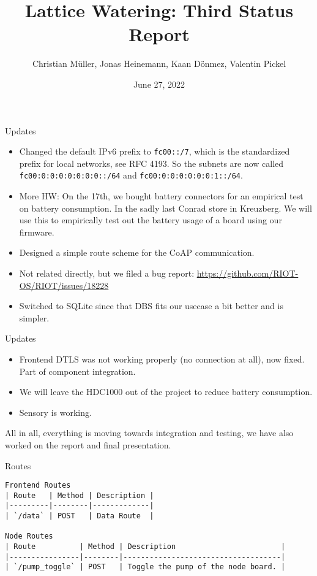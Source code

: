 \documentclass[10pt, xcolor=svgnames]{beamer}
\title{Lattice Watering: Third Status Report}
\author{Christian Müller, Jonas Heinemann, Kaan Dönmez, Valentin Pickel}
\institute{
    Software Project on Internet Communication

    Summer Term 2022
    
    Freie Universität Berlin

    Institute for Computer Science
}
\date{June 27, 2022}
\begin{document}
\maketitle

\begin{frame}{Updates}
    \begin{itemize}
        \item Changed the default IPv6 prefix to \texttt{fc00::/7}, which is the standardized prefix for local networks, see RFC 4193. So the subnets are now called \texttt{fc00:0:0:0:0:0:0:0::/64} and \texttt{fc00:0:0:0:0:0:0:1::/64}.
        \item More HW: On the 17th, we bought battery connectors for an empirical test on battery consumption. In the sadly last Conrad store in Kreuzberg. We will use this to empirically test out the battery usage of a board using our firmware.
        \item Designed a simple route scheme for the CoAP communication.
        \item Not related directly, but we filed a bug report: \url{https://github.com/RIOT-OS/RIOT/issues/18228}
        \item Switched to SQLite since that DBS fits our usecase a bit better and is simpler.
    \end{itemize}
\end{frame}

\begin{frame}{Updates}
    \begin{itemize}
        \item Frontend DTLS was not working properly (no connection at all), now fixed. Part of component integration.
        \item We will leave the HDC1000 out of the project to reduce battery consumption.
        \item Sensory is working.
    \end{itemize}

    All in all, everything is moving towards integration and testing, we have also worked on the report and final presentation.
\end{frame}

\begin{frame}[fragile]{Routes}
    \small
    \begin{verbatim}
Frontend Routes
| Route   | Method | Description |
|---------|--------|-------------|
| `/data` | POST   | Data Route  |

Node Routes
| Route          | Method | Description                        |
|----------------|--------|------------------------------------|
| `/pump_toggle` | POST   | Toggle the pump of the node board. |
    \end{verbatim}
\end{frame}
\end{document}
